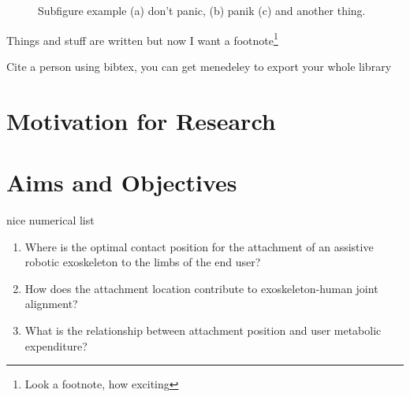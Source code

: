 \begin{figure}
	\centering    
	\caption[Subfigure example (a) don't panic, (b) panik (c) and another thing.]{Subfigure example (a) don't panic, (b) panik (c) and another thing.}
	\label{fig:FractureProne} %
\end{figure}

Things and stuff are written but now I want a footnote\footnote{Look a footnote, how exciting}


Cite a person using bibtex, you can get menedeley to export your whole library \cite{Cho2012} 



\section{Motivation for Research} \label{Attachment} %


\section{Aims and Objectives}

nice numerical list

\begin{enumerate}
	\item Where is the optimal contact position for the attachment of an assistive robotic exoskeleton to the limbs of the end user?
	\item How does the attachment location contribute to exoskeleton-human joint alignment?
	\item What is the relationship between attachment position and user metabolic expenditure?
\end{enumerate}

